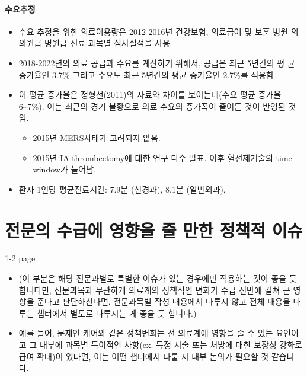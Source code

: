 \documentclass[]{book}
\providecommand{\tightlist}{%
  \setlength{\itemsep}{0pt}\setlength{\parskip}{0pt}}
\begin{document}
\hypertarget{section-7}{%
\subsubsection{수요추정}\label{section-7}}

\begin{itemize}
\item
  수요 추정을 위한 의료이용량은 2012-2016년 건강보험, 의료급여 및 보훈 병원 의 의원급 병원급 진료 과목별 심사실적을 사용
\item
  2018-2022년의 의료 공급과 수요를 계산하기 위해서, 공급은 최근 5년간의 평 균 증가율인 3.7\% 그리고 수요도 최근 5년간의 평균 증가율인 2.7\%를 적용함
\item
  이 평균 증가율은 정형선(2011)의 자료와 차이를 보이는데(수요 평균 증가율 6\textasciitilde7\%). 이는 최근의 경기 불황으로 의료 수요의 증가폭이 줄어든 것이 반영된 것임.

  \begin{itemize}
  \tightlist
  \item
    2015년 MERS사태가 고려되지 않음.
  \item
    2015년 IA thrombectomy에 대한 연구 다수 발표. 이후 혈전제거술의 time window가 늘어남.
  \end{itemize}
\item
  환자 1인당 평균진료시간: 7.9분 (신경과), 8.1분 (일반외과),
\end{itemize}

\hypertarget{section-8}{%
\chapter{전문의 수급에 영향을 줄 만한 정책적 이슈}\label{section-8}}

1-2 page

\begin{itemize}
\item
  (이 부분은 해당 전문과별로 특별한 이슈가 있는 경우에만 적용하는 것이 좋을 듯 합니다만, 전문과목과 무관하게 의료계의 정책적인 변화가 수급 전반에 걸쳐 큰 영향을 준다고 판단하신다면, 전문과목별 작성 내용에서 다루지 않고 전체 내용을 다루는 챕터에서 별도로 다루시는 게 좋을 듯 합니다.)
\item
  예를 들어, 문재인 케어와 같은 정책변화는 전 의료계에 영향을 줄 수 있는 요인이고 그 내부에 과목별 특이적인 사항(ex. 특정 시술 또는 처방에 대한 보장성 강화로 급여 확대)이 있다면, 이는 어떤 챕터에서 다룰 지 내부 논의가 필요할 것 같습니다.
\end{itemize}
\end{document}
